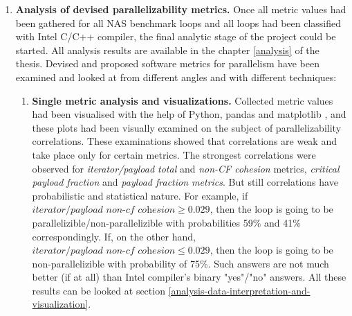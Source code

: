 \begin{enumerate}[align=left,leftmargin=*]
\item \textbf{Analysis of devised parallelizability metrics.}\newline
\null\qquad Once all metric values had been gathered for all NAS benchmark loops and all loops had been classified with Intel C/C++ compiler, the final analytic stage of the project could be started. All analysis results are available in the chapter \ref{analysis} of the thesis.\newline
\null\qquad Devised and proposed software metrics for parallelism have been examined and looked at from different angles and with different techniques:
\begin{enumerate}
\item \textbf{Single metric analysis and visualizations.}\newline
\null\qquad Collected metric values had been visualised with the help of Python, pandas \cite{python-lib-pandas} and matplotlib \cite{python-matplotlib}, and these plots had been visually examined on the subject of parallelizability correlations. These examinations showed that correlations are weak and take place only for certain metrics. The strongest correlations were observed for \textit{iterator/payload total} and \textit{non-CF cohesion} metrics, \textit{critical payload fraction} and \textit{payload fraction metrics}. But still correlations have probabilistic and statistical nature.\newline 
\null\qquad For example, if $\textit{iterator/payload non-cf cohesion} \ge 0.029$, then the loop is going to be parallelizible/non-parallelizible with probabilities 59\% and 41\% correspondingly. If, on the other hand, $\textit{iterator/payload non-cf cohesion} \le 0.029$, then the loop is going to be non-parallelizible with probability of 75\%. Such answers are not much better (if at all) than Intel compiler's binary "yes"/"no" answers. All these results can be looked at section \ref{analysis-data-interpretation-and-visualization}.\newline  


\end{enumerate}
\end{enumerate}
